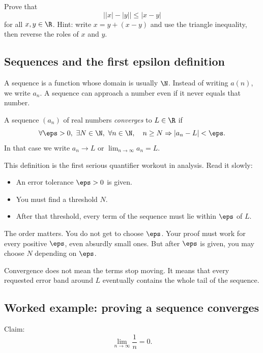 \begin{labbox}
Prove that
\[
\bigl||x|-|y|\bigr|\leq |x-y|
\]
for all $x,y\in\R$. Hint: write $x=y+(x-y)$ and use the triangle inequality,
then reverse the roles of $x$ and $y$.
\end{labbox}

\subsection{Sequences and the first epsilon definition}

A sequence is a function whose domain is usually $\N$. Instead of writing
$a(n)$, we write $a_n$. A sequence can approach a number even if it never equals
that number.

\begin{definition}
A sequence $(a_n)$ of real numbers \emph{converges} to $L\in\R$ if
\[
\forall \eps>0,\ \exists N\in\N,\ \forall n\in\N,\quad n\geq N\Rightarrow
|a_n-L|<\eps.
\]
In that case we write $a_n\to L$ or $\lim_{n\to\infty}a_n=L$.
\end{definition}

This definition is the first serious quantifier workout in analysis. Read it
slowly:

\begin{itemize}
\item An error tolerance $\eps>0$ is given.
\item You must find a threshold $N$.
\item After that threshold, every term of the sequence must lie within $\eps$
of $L$.
\end{itemize}

The order matters. You do not get to choose $\eps$. Your proof must work for
every positive $\eps$, even absurdly small ones. But after $\eps$ is given, you
may choose $N$ depending on $\eps$.

\begin{intuitionbox}
Convergence does not mean the terms stop moving. It means that every requested
error band around $L$ eventually contains the whole tail of the sequence.
\end{intuitionbox}

\subsection{Worked example: proving a sequence converges}

Claim:
\[
\lim_{n\to\infty}\frac{1}{n}=0.
\]


